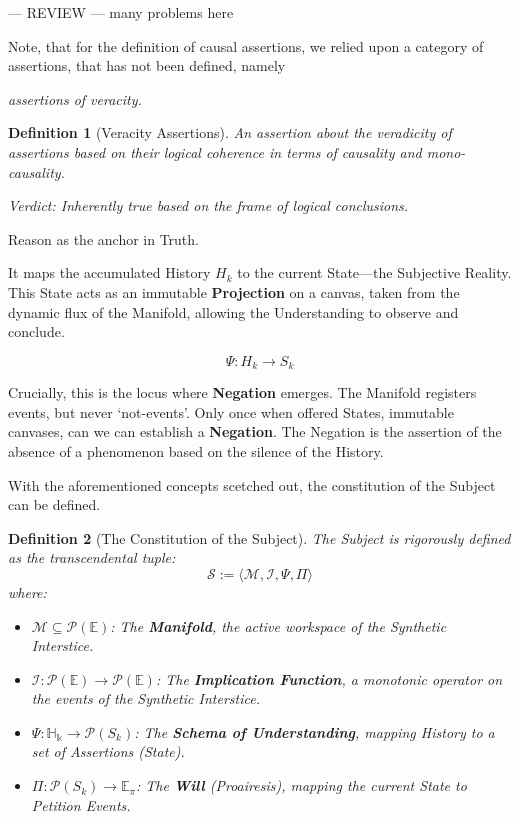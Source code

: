 \documentclass[11pt, a4paper]{article}
\theoremstyle{formalism}
\newtheorem{formalism}{Definition}
\begin{document}
--- REVIEW --- many problems here


Note, that for the definition of causal assertions, we relied upon a category
of assertions, that has not been defined, namely {\it assertions of veracity. 

\begin{formalism}[Veracity Assertions] 

    An assertion about the veradicity of assertions based on their logical
        coherence in terms of causality and mono-causality.

    \textit{Verdict:} Inherently true based on the frame of logical 
            conclusions.

\end{formalism}

Reason as the anchor in Truth.

It maps the accumulated History $H_k$ to the current State---the Subjective
Reality. This State acts as an immutable \textbf{Projection} on a canvas, taken
from the dynamic flux of the Manifold, allowing the Understanding to observe
and conclude.

\begin{equation}
\Psi: H_k \to S_k
\end{equation}

Crucially, this is the locus where \textbf{Negation} emerges. The Manifold
registers events, but never `not-events'. Only once when offered States, 
immutable canvases, can we can establish a \textbf{Negation}. The Negation is the
assertion of the absence of a phenomenon based on the silence of the History.

With the aforementioned concepts scetched out, the constitution of the Subject
can be defined.

\begin{formalism}[The Constitution of the Subject]
    The Subject is rigorously defined as the transcendental tuple:
    \begin{equation}
        \mathcal{S} := \langle \mathcal{M}, \mathcal{I}, \Psi, \Pi \rangle
    \end{equation}
    where:
    \begin{itemize}
        \item $\mathcal{M} \subseteq \mathcal{P}(\mathbb{E})$: The \textbf{Manifold}, the active workspace of the Synthetic Interstice.
        \item $\mathcal{I}: \mathcal{P}(\mathbb{E}) \to \mathcal{P}(\mathbb{E})$: The \textbf{Implication Function}, a monotonic operator on the events of the Synthetic Interstice.
        \item $\Psi: \mathbb{H_k} \to \mathcal{P}(S_k)$: The \textbf{Schema of Understanding}, mapping History to a set of Assertions (State).
        \item $\Pi: \mathcal{P}(S_k) \to \mathbb{E}_{\pi}$: The \textbf{Will} (Proairesis), mapping the current State to Petition Events.
    \end{itemize}
\end{formalism}

}
\end{document}
